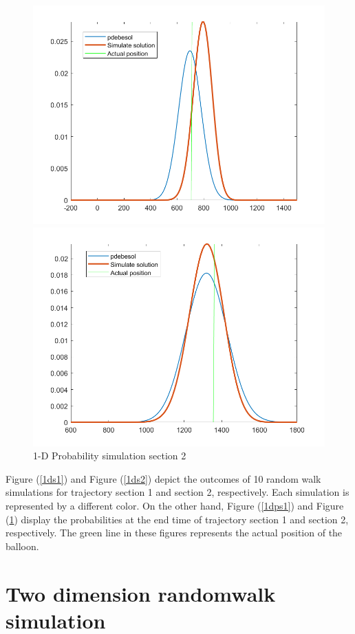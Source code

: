 \documentclass{article}
\begin{document}
\begin{multicols}{2}
\begin{figure}[ht]
\begin{minipage}{0.45\linewidth}
\includegraphics[width=0.8\linewidth]{graph/1ddis1.png} 
\caption{1-D Probability simulation section 1}
\label{1dps1}
\end{minipage}
\hfill
\begin{minipage}{0.45\linewidth}
\centering
\includegraphics[width=0.8\linewidth]{graph/1ddis2.png} 
\caption{1-D Probability simulation section 2}
\label{1dps2}
\end{minipage}
\end{figure}
Figure (\ref{1ds1}) and Figure (\ref{1ds2}) depict the outcomes of 10 random walk simulations for trajectory section 1 and section 2, respectively. Each simulation is represented by a different color. On the other hand, Figure (\ref{1dps1}) and Figure (\ref{1dps2}) display the probabilities at the end time of trajectory section 1 and section 2, respectively. The green line in these figures represents the actual position of the balloon.






\section{Two dimension randomwalk simulation}

\end{multicols}
\end{document}
